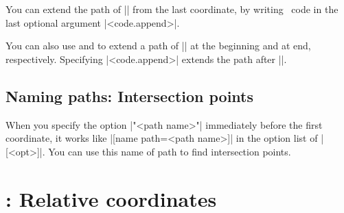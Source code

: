 You can extend the path of |\tzline| from the last coordinate, by writing \Tikz\ code in the last optional argument |<code.append>|.

\begin{tzcode}{.3}
\end{tzcode}

You can also use \icmd{\tzlineAtBegin} and \icmd{\tzlineAtEnd} to extend a path of |\tzline| at the beginning and at end, respectively.
Specifying |<code.append>| extends the path after |\tzlineAtEnd|.

\begin{tzcode}{.3}
\end{tzcode}

\subsection{Naming paths: Intersection points}
\label{ss:tzline:namepath}

When you specify the option |"<path name>"| immediately before the first coordinate, it works like |[name path=<path name>]| in the option list of |[<opt>]|.
You can use this name of path to find intersection points.

\begin{tzcode}{.3}
\end{tzcode}


\section{\protect\cmd{\tzline+}: Relative coordinates}
\label{s:tzline+}

